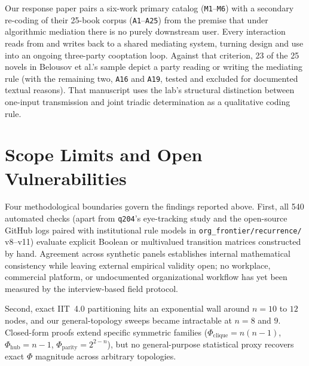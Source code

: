 \documentclass[11pt,a4paper]{article}
\begin{document}
Our response paper pairs a six-work primary catalog (\texttt{M1}--\texttt{M6}) with a secondary re-coding of their 25-book corpus (\texttt{A1}--\texttt{A25}) from the premise that under algorithmic mediation there is no purely downstream user. Every interaction reads from and writes back to a shared mediating system, turning design and use into an ongoing three-party cooptation loop. Against that criterion, 23 of the 25 novels in Belousov et al.'s sample depict a party reading or writing the mediating rule (with the remaining two, \texttt{A16} and \texttt{A19}, tested and excluded for documented textual reasons). That manuscript uses the lab's structural distinction between one-input transmission and joint triadic determination as a qualitative coding rule.

\section{Scope Limits and Open Vulnerabilities}

Four methodological boundaries govern the findings reported above. First, all 540 automated checks (apart from \texttt{q204}'s eye-tracking study and the open-source GitHub logs paired with institutional rule models in \texttt{org\_frontier/recurrence/} v8--v11) evaluate explicit Boolean or multivalued transition matrices constructed by hand. Agreement across synthetic panels establishes internal mathematical consistency while leaving external empirical validity open; no workplace, commercial platform, or undocumented organizational workflow has yet been measured by the interview-based field protocol.

Second, exact IIT~4.0 partitioning hits an exponential wall around $n = 10$ to $12$ nodes, and our general-topology sweeps became intractable at $n = 8$ and $9$. Closed-form proofs extend specific symmetric families ($\Phi_{\mathrm{clique}} = n(n - 1)$, $\Phi_{\mathrm{hub}} = n - 1$, $\Phi_{\mathrm{parity}} = 2^{2-n}$), but no general-purpose statistical proxy recovers exact $\Phi$ magnitude across arbitrary topologies.
\end{document}
